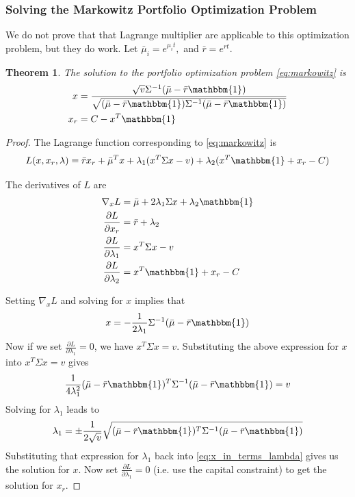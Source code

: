 \documentclass{amsart}
\newtheorem{thm}{Theorem}[section]
\theoremstyle{definition}
\theoremstyle{remark}
\begin{document}
\subsubsection{Solving the Markowitz Portfolio Optimization Problem}
We do not prove that that Lagrange multiplier are applicable to this optimization problem, but they do work. Let $\bar{\mu}_i = e^{\mu_i t},$ and $\bar{r} = e^{rt}$.

\begin{thm}
The solution to the portfolio optimization problem \eqref{eq:markowitz} is
\begin{align*}
x &= \frac{\sqrt{v} \Sigma^{-1} (\bar{\mu} - \bar{r}\mathbbm{1})}{\sqrt{(\bar{\mu} - \bar{r}\mathbbm{1}) \Sigma^{-1} (\bar{\mu} - \bar{r}\mathbbm{1})}}\\
x_r &= C - x^T \mathbbm{1}
\end{align*}
\end{thm}
\begin{proof}
The Lagrange function corresponding to \eqref{eq:markowitz} is
\begin{equation*}
L(x,x_r,\lambda) = \bar{r} x_r + \bar{\mu}^T x + \lambda_1(x^T \Sigma x - v) + \lambda_2(x^T \mathbbm{1} + x_r - C)
\end{equation*}

The derivatives of $L$ are
\begin{align*}
\nabla_x L &= \bar{\mu} + 2\lambda_1\Sigma x + \lambda_2 \mathbbm{1}\\
\frac{\partial L}{\partial x_r} &= \bar{r}+\lambda_2\\
\frac{\partial L}{\partial \lambda_1} &= x^T \Sigma x - v\\
\frac{\partial L}{\partial \lambda_2} &= x^T \mathbbm{1} + x_r - C
\end{align*}

Setting $\nabla_x L$ and solving for $x$ implies that
\begin{equation}\label{eq:x_in_terms_lambda}
x = -\frac{1}{2\lambda_1} \Sigma^{-1}(\bar{\mu} - \bar{r}\mathbbm{1})
\end{equation}
Now if we set $\frac{\partial L}{\partial \lambda_1} = 0$, we have $x^T\Sigma x = v$. Substituting the above expression for $x$ into $x^T\Sigma x = v$ gives
\begin{equation*}
\frac{1}{4\lambda_1^2} (\bar{\mu}-\bar{r}\mathbbm{1})^T\Sigma^{-1} (\bar{\mu}-\bar{r}\mathbbm{1}) = v
\end{equation*}
Solving for $\lambda_1$ leads to
\begin{equation*}
\lambda_1 = \pm \frac{1}{2\sqrt{v}} \sqrt{(\bar{\mu}-\bar{r}\mathbbm{1})^T\Sigma^{-1} (\bar{\mu}-\bar{r}\mathbbm{1})}
\end{equation*}
Substituting that expression for $\lambda_1$ back into \eqref{eq:x_in_terms_lambda} gives us the solution for $x$. Now set $\frac{\partial L}{\partial \lambda_1} = 0$ (i.e. use the capital constraint) to get the solution for $x_r$.
\end{proof}
\end{document}

